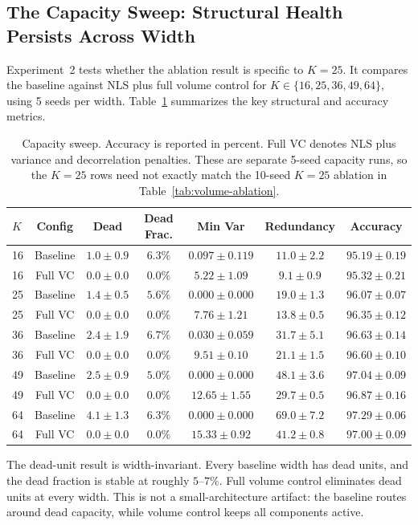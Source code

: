 \subsection{The Capacity Sweep: Structural Health Persists Across Width}
Experiment~2 tests whether the ablation result is specific to $K=25$. It
compares the baseline against NLS plus full volume control for
$K\in\{16,25,36,49,64\}$, using 5 seeds per width. Table~\ref{tab:capacity}
summarizes the key structural and accuracy metrics.
\begin{table}[h]
\centering
\begin{tabular}{lcccccc}
\toprule
$K$ & Config & Dead & Dead Frac. & Min Var & Redundancy & Accuracy \\
\midrule
16 & Baseline & $1.0\pm0.9$ & $6.3\%$ & $0.097\pm0.119$ & $11.0\pm2.2$ & $95.19\pm0.19$ \\
16 & Full VC & $0.0\pm0.0$ & $0.0\%$ & $5.22\pm1.09$ & $9.1\pm0.9$ & $95.32\pm0.21$ \\
25 & Baseline & $1.4\pm0.5$ & $5.6\%$ & $0.000\pm0.000$ & $19.0\pm1.3$ & $96.07\pm0.07$ \\
25 & Full VC & $0.0\pm0.0$ & $0.0\%$ & $7.76\pm1.21$ & $13.8\pm0.5$ & $96.35\pm0.12$ \\
36 & Baseline & $2.4\pm1.9$ & $6.7\%$ & $0.030\pm0.059$ & $31.7\pm5.1$ & $96.63\pm0.14$ \\
36 & Full VC & $0.0\pm0.0$ & $0.0\%$ & $9.51\pm0.10$ & $21.1\pm1.5$ & $96.60\pm0.10$ \\
49 & Baseline & $2.5\pm0.9$ & $5.0\%$ & $0.000\pm0.000$ & $48.1\pm3.6$ & $97.04\pm0.09$ \\
49 & Full VC & $0.0\pm0.0$ & $0.0\%$ & $12.65\pm1.55$ & $29.7\pm0.5$ & $96.87\pm0.16$ \\
64 & Baseline & $4.1\pm1.3$ & $6.3\%$ & $0.000\pm0.000$ & $69.0\pm7.2$ & $97.29\pm0.06$ \\
64 & Full VC & $0.0\pm0.0$ & $0.0\%$ & $15.33\pm0.92$ & $41.2\pm0.8$ & $97.00\pm0.09$ \\
\bottomrule
\end{tabular}
\caption{Capacity sweep. Accuracy is reported in percent. Full VC denotes NLS
plus variance and decorrelation penalties. These are separate 5-seed capacity
runs, so the $K=25$ rows need not exactly match the 10-seed $K=25$ ablation in
Table~\ref{tab:volume-ablation}.}
\label{tab:capacity}
\end{table}
The dead-unit result is width-invariant. Every baseline width has dead units,
and the dead fraction is stable at roughly $5$--$7\%$. Full volume control
eliminates dead units at every width. This is not a small-architecture
artifact: the baseline routes around dead capacity, while volume control keeps
all components active.

